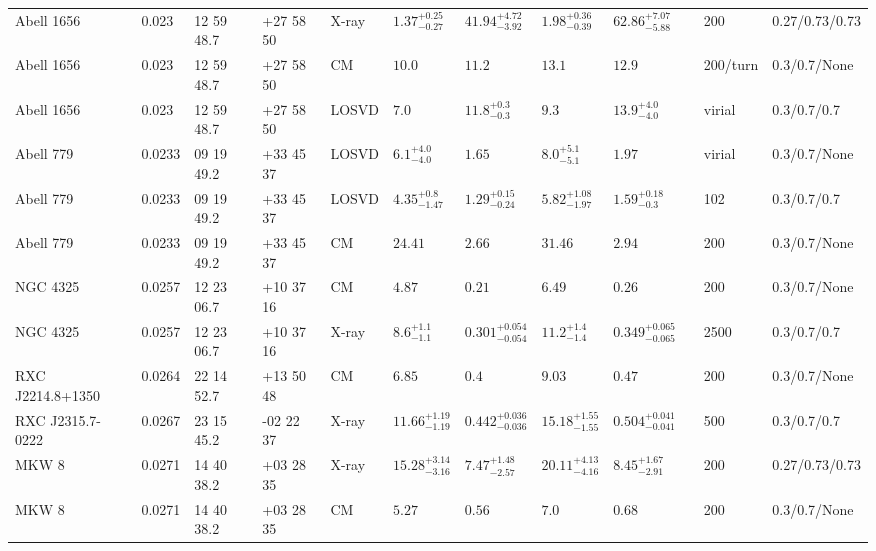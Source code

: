 \begin{landscape}
\begin{center}
{\begin{longtable}{llllllllllll}
Abell 1656 & 0.023 & 12 59 48.7 & +27 58 50 & X-ray & ${1.37}^{+0.25}_{-0.27}$ & ${41.94}^{+4.72}_{-3.92}$ & ${1.98}^{+0.36}_{-0.39}$ & ${62.86}^{+7.07}_{-5.88}$ & \citet{BA14.1} & 200 & 0.27/0.73/0.73 \\
Abell 1656 & 0.023 & 12 59 48.7 & +27 58 50 & CM & ${10.0}^{}_{}$ & ${11.2}^{}_{}$ & ${13.1}^{}_{}$ & ${12.9}^{}_{}$ & \citet{RI03.1} & 200/turn & 0.3/0.7/None \\
Abell 1656 & 0.023 & 12 59 48.7 & +27 58 50 & LOSVD & ${7.0}^{}_{}$ & ${11.8}^{+0.3}_{-0.3}$ & ${9.3}^{}_{}$ & ${13.9}^{+4.0}_{-4.0}$ & \citet{LO03.1} & virial & 0.3/0.7/0.7 \\
Abell 779 & 0.0233 & 09 19 49.2 & +33 45 37 & LOSVD & ${6.1}^{+4.0}_{-4.0}$ & ${1.65}^{}_{}$ & ${8.0}^{+5.1}_{-5.1}$ & ${1.97}^{}_{}$ & \citet{AB11.1} & virial & 0.3/0.7/None \\
Abell 779 & 0.0233 & 09 19 49.2 & +33 45 37 & LOSVD & ${4.35}^{+0.8}_{-1.47}$ & ${1.29}^{+0.15}_{-0.24}$ & ${5.82}^{+1.08}_{-1.97}$ & ${1.59}^{+0.18}_{-0.3}$ & \citet{WO10.1} & 102 & 0.3/0.7/0.7 \\
Abell 779 & 0.0233 & 09 19 49.2 & +33 45 37 & CM & ${24.41}^{}_{}$ & ${2.66}^{}_{}$ & ${31.46}^{}_{}$ & ${2.94}^{}_{}$ & \citet{RI06.1} & 200 & 0.3/0.7/None \\
NGC 4325 & 0.0257 & 12 23 06.7 & +10 37 16 & CM & ${4.87}^{}_{}$ & ${0.21}^{}_{}$ & ${6.49}^{}_{}$ & ${0.26}^{}_{}$ & \citet{RI06.1} & 200 & 0.3/0.7/None \\
NGC 4325 & 0.0257 & 12 23 06.7 & +10 37 16 & X-ray & ${8.6}^{+1.1}_{-1.1}$ & ${0.301}^{+0.054}_{-0.054}$ & ${11.2}^{+1.4}_{-1.4}$ & ${0.349}^{+0.065}_{-0.065}$ & \citet{GA06.1} & 2500 & 0.3/0.7/0.7 \\
RXC J2214.8+1350 & 0.0264 & 22 14 52.7 & +13 50 48 & CM & ${6.85}^{}_{}$ & ${0.4}^{}_{}$ & ${9.03}^{}_{}$ & ${0.47}^{}_{}$ & \citet{RI06.1} & 200 & 0.3/0.7/None \\
RXC J2315.7-0222 & 0.0267 & 23 15 45.2 & -02 22 37 & X-ray & ${11.66}^{+1.19}_{-1.19}$ & ${0.442}^{+0.036}_{-0.036}$ & ${15.18}^{+1.55}_{-1.55}$ & ${0.504}^{+0.041}_{-0.041}$ & \citet{DE10.1} & 500 & 0.3/0.7/0.7 \\
MKW 8 & 0.0271 & 14 40 38.2 & +03 28 35 & X-ray & ${15.28}^{+3.14}_{-3.16}$ & ${7.47}^{+1.48}_{-2.57}$ & ${20.11}^{+4.13}_{-4.16}$ & ${8.45}^{+1.67}_{-2.91}$ & \citet{BA14.1} & 200 & 0.27/0.73/0.73 \\
MKW 8 & 0.0271 & 14 40 38.2 & +03 28 35 & CM & ${5.27}^{}_{}$ & ${0.56}^{}_{}$ & ${7.0}^{}_{}$ & ${0.68}^{}_{}$ & \citet{RI06.1} & 200 & 0.3/0.7/None \\

\end{longtable}}
\end{center}
\end{landscape}
